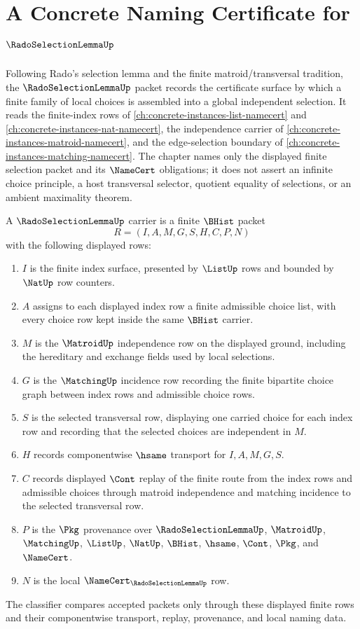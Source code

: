 \chapter{A Concrete Naming Certificate for $\RadoSelectionLemmaUp$}
\label{ch:concrete-instances-rado-selection-lemma-namecert}

Following Rado's selection lemma and the finite matroid/transversal tradition, the $\RadoSelectionLemmaUp$ packet records the certificate surface by which a finite family of local choices is assembled into a global independent selection. It reads the finite-index rows of \autoref{ch:concrete-instances-list-namecert} and \autoref{ch:concrete-instances-nat-namecert}, the independence carrier of \autoref{ch:concrete-instances-matroid-namecert}, and the edge-selection boundary of \autoref{ch:concrete-instances-matching-namecert}. The chapter names only the displayed finite selection packet and its $\NameCert$ obligations; it does not assert an infinite choice principle, a host transversal selector, quotient equality of selections, or an ambient maximality theorem.

\begin{definition}
\label{def:rado-selection-lemma-carrier}
A $\RadoSelectionLemmaUp$ carrier is a finite $\BHist$ packet
$$
R=(I,A,M,G,S,H,C,P,N)
$$
with the following displayed rows:
\begin{enumerate}
\item $I$ is the finite index surface, presented by $\ListUp$ rows and bounded by $\NatUp$ row counters.
\item $A$ assigns to each displayed index row a finite admissible choice list, with every choice row kept inside the same $\BHist$ carrier.
\item $M$ is the $\MatroidUp$ independence row on the displayed ground, including the hereditary and exchange fields used by local selections.
\item $G$ is the $\MatchingUp$ incidence row recording the finite bipartite choice graph between index rows and admissible choice rows.
\item $S$ is the selected transversal row, displaying one carried choice for each index row and recording that the selected choices are independent in $M$.
\item $H$ records componentwise $\hsame$ transport for $I,A,M,G,S$.
\item $C$ records displayed $\Cont$ replay of the finite route from the index rows and admissible choices through matroid independence and matching incidence to the selected transversal row.
\item $P$ is the $\Pkg$ provenance over $\RadoSelectionLemmaUp$, $\MatroidUp$, $\MatchingUp$, $\ListUp$, $\NatUp$, $\BHist$, $\hsame$, $\Cont$, $\Pkg$, and $\NameCert$.
\item $N$ is the local $\NameCert_{\RadoSelectionLemmaUp}$ row.
\end{enumerate}
The classifier compares accepted packets only through these displayed finite rows and their componentwise transport, replay, provenance, and local naming data.
\end{definition}

